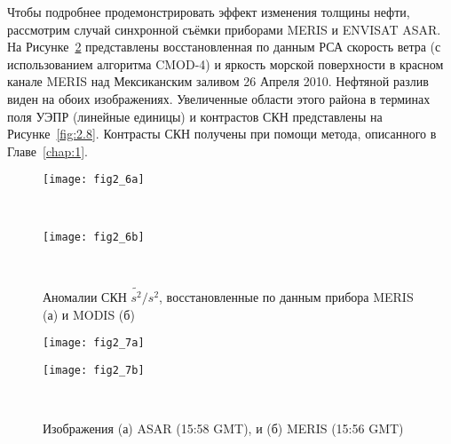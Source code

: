 Чтобы подробнее продемонстрировать эффект изменения толщины нефти, рассмотрим случай синхронной съёмки приборами MERIS и ENVISAT ASAR. На Рисунке~\ref{fig:2.7} представлены восстановленная по данным РСА скорость ветра (с использованием алгоритма CMOD-4) и яркость морской поверхности в красном канале MERIS над Мексиканским заливом 26 Апреля 2010. Нефтяной разлив виден на обоих изображениях. Увеличенные области этого района в терминах поля УЭПР (линейные единицы) и контрастов СКН представлены на Рисунке~\ref{fig:2.8}. Контрасты СКН получены при помощи метода, описанного в Главе~\ref{chap:1}.



\begin{figure}[H]
   	\centering
	\begin{minipage}{.83\textwidth}
	    \subcaptionbox{\label{fig:2.6a}}
		{\texttt{[image: fig2\_6a]}}
	\end{minipage}
	\hfill
	\\
	\begin{minipage}{.83\textwidth}
	    \subcaptionbox{\label{fig:2.6b}}
		{\texttt{[image: fig2\_6b]}}
	\end{minipage}
    \\
    \caption{Аномалии СКН $\widetilde{s^{2} }/s^{2}$, восстановленные по данным прибора MERIS (а) и MODIS (б)}
    \label{fig:2.6}
\end{figure}


\begin{figure}[H]
   	\centering
	\begin{minipage}{.49\textwidth}
	    \subcaptionbox{\label{fig:2.7a}}
		{\texttt{[image: fig2\_7a]}}
	\end{minipage}
	\hfill
	\begin{minipage}{.49\textwidth}
	    \subcaptionbox{\label{fig:2.7b}}
		{\texttt{[image: fig2\_7b]}}
	\end{minipage}
    \\
    \caption{Изображения (а) ASAR (15:58 GMT), и (б) MERIS (15:56 GMT)}
    \label{fig:2.7}
\end{figure}


